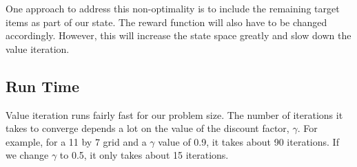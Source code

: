 \documentclass{pset}
\begin{document}
One approach to address this non-optimality is to include the remaining target items as part of our state. 
The reward function will also have to be changed accordingly. However, this will increase the state
space greatly and slow down the value iteration. 


\subsection{Run Time}
Value iteration runs fairly fast for our problem size. The number of iterations it takes to converge
depends a lot on the value of the discount factor, $\gamma$. For example, for a 11 by 7 grid and a
$\gamma$ value of 0.9, it takes about 90 iterations. If we change $\gamma$ to 0.5, it only takes about
15 iterations. 




\end{document}
